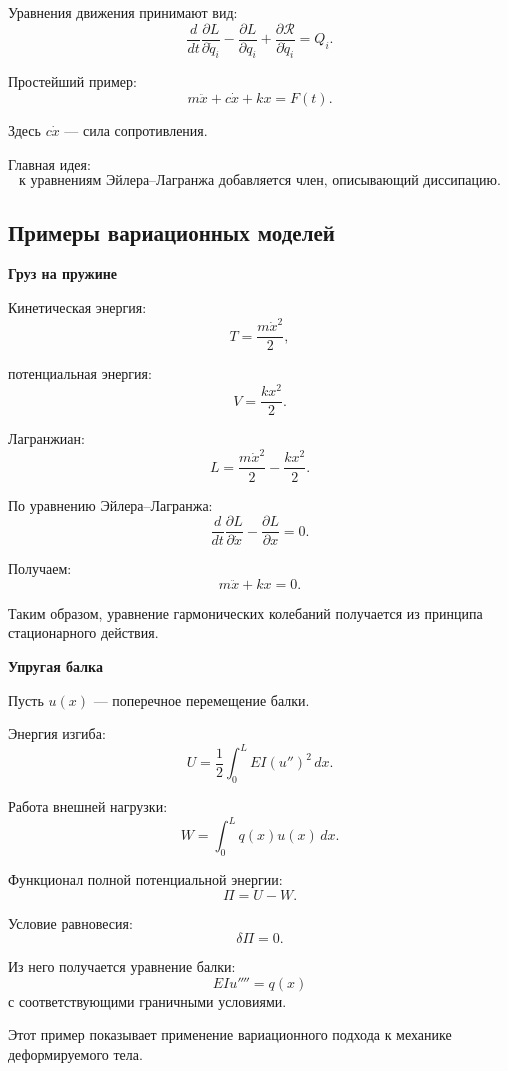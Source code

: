 Уравнения движения принимают вид:
\[
\boxed{
	\frac{d}{dt}
	\frac{\partial L}{\partial\dot q_i}
	-
	\frac{\partial L}{\partial q_i}
	+
	\frac{\partial\mathcal R}{\partial\dot q_i}
	=
	Q_i
}.
\]

Простейший пример:
\[
\boxed{
	m\ddot x+c\dot x+kx=F(t).
}
\]

Здесь $c\dot x$ --- сила сопротивления.

Главная идея:
\[
\boxed{
	\text{к уравнениям Эйлера--Лагранжа добавляется
		член, описывающий диссипацию}.
}
\]

\subsection{Примеры вариационных моделей}

\textbf{Груз на пружине}

Кинетическая энергия:
\[
T=\frac{m\dot x^2}{2},
\]

потенциальная энергия:
\[
V=\frac{kx^2}{2}.
\]

Лагранжиан:
\[
L=\frac{m\dot x^2}{2}-\frac{kx^2}{2}.
\]

По уравнению Эйлера--Лагранжа:
\[
\frac{d}{dt}\frac{\partial L}{\partial\dot x}
-
\frac{\partial L}{\partial x}=0.
\]

Получаем:
\[
\boxed{
	m\ddot x+kx=0
}.
\]

Таким образом, уравнение гармонических колебаний получается
из принципа стационарного действия.

\textbf{Упругая балка}

Пусть $u(x)$ --- поперечное перемещение балки.

Энергия изгиба:
\[
U=
\frac12\int_0^L EI(u'')^2\,dx.
\]

Работа внешней нагрузки:
\[
W=\int_0^Lq(x)u(x)\,dx.
\]

Функционал полной потенциальной энергии:
\[
\Pi=U-W.
\]

Условие равновесия:
\[
\boxed{\delta\Pi=0}.
\]

Из него получается уравнение балки:
\[
\boxed{
	EIu''''=q(x)
}
\]
с соответствующими граничными условиями.

Этот пример показывает применение вариационного подхода
к механике деформируемого тела.

\newpage